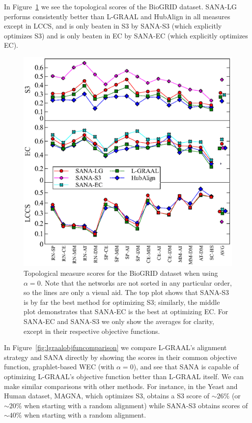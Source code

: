 \documentclass{bioinfo}
\begin{document}
In Figure~\ref{fig:biogrid_alpha0} we see the topological scores of the BioGRID dataset. SANA-LG performs consistently better than L-GRAAL and HubAlign in all measures except in LCCS, and is only beaten in S3 by SANA-S3 (which explicitly optimizes S3) and is only beaten in EC by SANA-EC (which explicitly optimizes EC).

\begin{figure}
\centering
\includegraphics[width=0.99\linewidth]{biogridBeta0.eps}
\caption{Topological measure scores for the BioGRID dataset when using $\alpha=0$. Note that the networks are not sorted in any particular order, so the lines are only a visual aid. The top plot shows that SANA-S3 is by far the best method for optimizing S3; similarly, the middle plot demonstrates that SANA-EC is the best at optimizing EC. For SANA-EC and SANA-S3 we only show the averages for clarity, except in their respective objective functions.}
\label{fig:biogrid_alpha0}
\end{figure}

In Figure~\ref{fig:lgraalobjfuncomparison} we compare L-GRAAL's alignment strategy and SANA directly by showing the scores in their common objective function, graphlet-based WEC (with $\alpha=0$), and see that SANA is capable of optimizing L-GRAAL's objective function better than L-GRAAL itself. We can make similar comparisons with other methods. For instance, in the Yeast and Human dataset, MAGNA, which optimizes S3, obtains a S3 score of ${\sim}26\%$ (or ${\sim}20\%$ when starting with a random alignment) while SANA-S3 obtains scores of ${\sim}40\%$ when starting with a random alignment.
\end{document}
